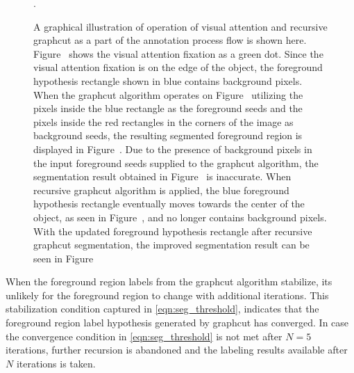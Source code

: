 \documentclass {udthesis}
\begin{document}
\begin{figure}
\begin{subfigure}[]{0.2\textwidth}
      \caption{}
      \label{fig:good_seg_recursive_seg}
  \end{subfigure}
\caption[Illustration of annotation process flow]{A graphical illustration of operation of visual attention and recursive graphcut as a part of the annotation process flow is shown here. Figure~ shows the visual attention fixation as a green dot. Since the visual attention fixation is on the edge of the object, the foreground hypothesis rectangle shown in blue contains background pixels. When the graphcut algorithm operates on Figure~ utilizing the pixels inside the blue rectangle as the foreground seeds and the pixels inside the red rectangles in the corners of the image as background seeds, the resulting segmented foreground region is displayed in Figure~. Due to the presence of background pixels in the input foreground seeds supplied to the graphcut algorithm, the segmentation result obtained in Figure~ is inaccurate. When recursive graphcut algorithm is applied, the blue foreground hypothesis rectangle eventually moves towards the center of the object, as seen in Figure~, and no longer contains background pixels. With the updated foreground hypothesis rectangle after recursive graphcut segmentation, the improved segmentation result can be seen in Figure~}.
\label{fig:annotation_good_seg}
\end{figure}	
%
When the foreground region labels from the graphcut algorithm stabilize, its unlikely for the foreground region to change with additional iterations. This stabilization condition captured in \eqref{eqn:seg_threshold}, indicates that the foreground region label hypothesis generated by graphcut has converged. In case the convergence condition in \eqref{eqn:seg_threshold} is not met after $N=5$ iterations, further recursion is abandoned and the labeling results available after $N$ iterations is taken.
\end{document}
